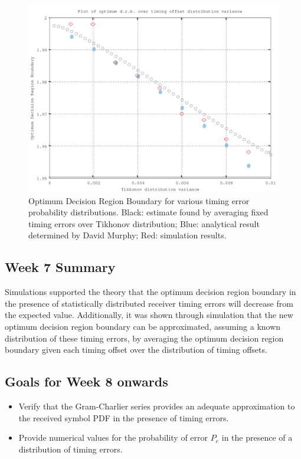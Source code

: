 \begin{figure}[htbp]
\centering
\includegraphics[width=\linewidth]{../../../plots/opt_dec_reg.png}
\caption{Optimum Decision Region Boundary for various timing error
probability distributions. Black: estimate found by averaging fixed timing errors over Tikhonov distribution; Blue: analytical result determined by David Murphy; Red: simulation results.}
\end{figure}

\subsection{Week 7 Summary}

Simulations supported the theory that the optimum decision region
boundary in the presence of statistically distributed receiver timing
errors will decrease from the expected value. Additionally, it was shown
through simulation that the new optimum decision region boundary can be
approximated, assuming a known distribution of these timing errors, by
averaging the optimum decision region boundary given each timing offset
over the distribution of timing offsets.

\subsection{Goals for Week 8 onwards}

\begin{itemize}
\itemsep1pt\parskip0pt
\item
  Verify that the Gram-Charlier series provides an adequate
  approximation to the received symbol PDF in the presence of timing
  errors.
\item
  Provide numerical values for the probability of error $P_e$ in the
  presence of a distribution of timing errors.
\end{itemize}

